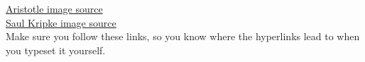 \documentclass{article}
\theoremstyle{remark}
\begin{document}
\begin{figure}[H]
    \centering
    \begin{floatrow}
    \end{floatrow}
    \label{philosophers}
\end{figure}

\href{https://www.britannica.com/biography/Aristotle#/media/1/34560/76426}{Aristotle image source} \\
\href{https://commons.wikimedia.org/w/index.php?curid=5763037}{Saul Kripke image source} \\
Make sure you follow these links, so you know where the hyperlinks lead to when you typeset it yourself.
\end{document}
